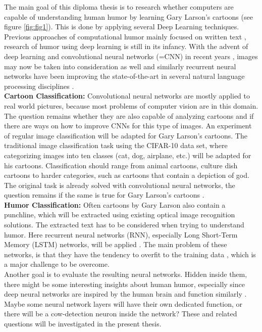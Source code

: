 \documentclass[draft,final,oneside]{vutinfth} %
\begin{document}
The main goal of this diploma thesis is to research whether computers are capable of understanding human humor by learning Gary Larson's cartoons (see figure \ref{fig:fig1}). This is done by applying several Deep Learning techniques. \\


Previous approaches of computational humor mainly focused on written text \cite{Yang2015HumorRA}\cite{Bamman2015ContextualizedSD}\cite{HumoristBot}, research of humor using deep learning is still in its infancy. With the advent of deep learning and convolutional neural networks (=CNN) in recent years \cite{Druzhkov2016}, images may now be taken into consideration as well and similarly recurrent neural networks have been improving the state-of-the-art in several natural language processing disciplines \cite{reviewRNN}. \\

\textbf {Cartoon Classification:} \quad Convolutional neural networks are mostly applied to real world pictures, because most problems of computer vision are in this domain. The question remains whether they are also capable of analyzing cartoons and if there are ways on how to improve CNNs for this type of images. An experiment of regular image classification will be adapted for Gary Larson's cartoons. The traditional image classification task using the CIFAR-10 data set, where categorizing images into ten classes (cat, dog, airplane, etc.) will be adapted for his cartoons. Classification should range from animal cartoons, culture dish cartoons to harder categories, such as cartoons that contain a depiction of god. The original task is already solved with convolutional neural networks, the question remains if the same is true for Gary Larson's cartoons \cite{dogsvscats}. \\

\textbf {Humor Classification:} \quad Often cartoons by Gary Larson also contain a punchline, which will be extracted using existing optical image recognition solutions. The extracted text has to be considered when trying to understand humor. Here recurrent neural networks (RNN), especially Long Short-Term Memory (LSTM) networks, will be applied \cite{hochreiter}. The main problem of these networks, is that they have the tendency to overfit to the training data \cite[page 4]{reviewRNN}, which is a major challenge to be overcome. \\

Another goal is to evaluate the resulting neural networks. Hidden inside them, there might be some interesting insights about human humor, especially since deep neural networks are inspired by the human brain and function similarly \cite{Cichy2016}. Maybe some neural network layers will have their own dedicated function, or there will be a cow-detection neuron inside the network? These and related questions will be investigated in the present thesis.
\end{document}
